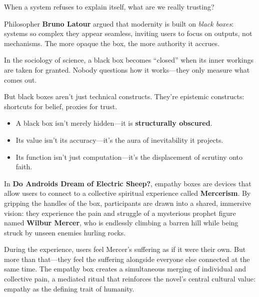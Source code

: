 \begin{tcolorbox}[colback=blue!5!white, colframe=blue!50!black, breakable,
  title={Philosophical Sidebar: The Black Box as Epistemic Mirage}]

When a system refuses to explain itself, what are we really trusting?

\medskip

Philosopher \textbf{Bruno Latour} argued that modernity is built on \textit{black boxes}: systems so complex they appear seamless, inviting users to focus on outputs, not mechanisms. The more opaque the box, the more authority it accrues.

\medskip

In the sociology of science, a black box becomes “closed” when its inner workings are taken for granted. Nobody questions how it works—they only measure what comes out.

\medskip

But black boxes aren’t just technical constructs. They’re epistemic constructs: shortcuts for belief, proxies for trust.

\medskip

\begin{itemize}
    \item A black box isn’t merely hidden—it is \textbf{structurally obscured}.
    \item Its value isn’t its accuracy—it’s the aura of inevitability it projects.
    \item Its function isn’t just computation—it’s the displacement of scrutiny onto faith.
\end{itemize}

\medskip

In \textbf{Do Androids Dream of Electric Sheep?}, empathy boxes are devices that allow users to connect to a collective spiritual experience called \textbf{Mercerism}. By gripping the handles of the box, participants are drawn into a shared, immersive vision: they experience the pain and struggle of a mysterious prophet figure named \textbf{Wilbur Mercer}, who is endlessly climbing a barren hill while being struck by unseen enemies hurling rocks.

\medskip

During the experience, users feel Mercer’s suffering as if it were their own. But more than that—they feel the suffering alongside everyone else connected at the same time. The empathy box creates a simultaneous merging of individual and collective pain, a mediated ritual that reinforces the novel’s central cultural value: empathy as the defining trait of humanity.


\end{tcolorbox}
